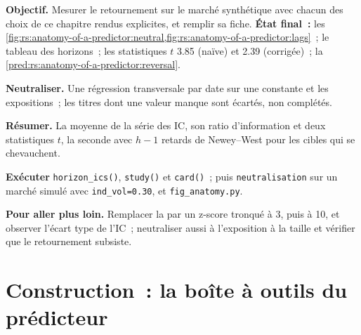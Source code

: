\begin{tutorial}
\textbf{Objectif.} Mesurer le retournement sur le marché synthétique avec chacun des choix de ce chapitre rendus explicites, et remplir sa fiche.
\textbf{État final~:} les \cref{fig:rs:anatomy-of-a-predictor:neutral,fig:rs:anatomy-of-a-predictor:lags}~; le tableau des horizons~; les
statistiques $t$ 3.85 (naïve) et 2.39 (corrigée)~; la \cref{pred:rs:anatomy-of-a-predictor:reversal}.
\begin{tutsteps}
\item \textbf{Neutraliser.} Une régression transversale par date sur une constante et les expositions~; les titres dont une valeur manque
sont écartés, non complétés.
\label{lst:rs:anatomy-of-a-predictor:residual}
\item \textbf{Résumer.} La moyenne de la série des IC, son ratio d'information et deux statistiques $t$, la seconde avec $h - 1$ retards de Newey--West
pour les cibles qui se chevauchent.
\label{lst:rs:anatomy-of-a-predictor:summary}
\item \textbf{Exécuter} \texttt{horizon\_ics()}, \texttt{study()} et \texttt{card()}~; puis \texttt{neutralisation} sur un marché simulé
avec \texttt{ind\_vol=0.30}, et \texttt{fig\_anatomy.py}.
\end{tutsteps}
\textbf{Pour aller plus loin.} Remplacer la  par un z-score tronqué à 3, puis à 10, et observer l'écart type de l'IC~;
neutraliser aussi à l'exposition à la taille et vérifier que le retournement subsiste.
\end{tutorial}

\section{Construction~: la boîte à outils du prédicteur}\label{bld:rs:anatomy-of-a-predictor:predictor}

